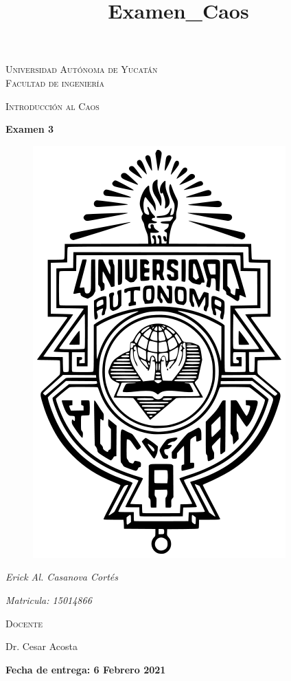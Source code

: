 \documentclass[11pt]{report}
\theoremstyle{plain}
\theoremstyle{definition}
\begin{document}
\begin{titlepage}
\title{Examen_Caos}


	\centering
	{\scshape\LARGE Universidad Autónoma de Yucatán  \\ Facultad de ingeniería\par}
	\vspace{1cm}
	{\scshape\Large Introducción al Caos\par}
	\vspace{1.5cm}
	{\huge\bfseries Examen 3\par}
	\vspace{0.7cm}
	{\begin{figure}[!h]
	\centering
    \includegraphics[scale=0.3]{UADY.png}
	\end{figure}}
	\vspace{0.7cm}
	{\Large\itshape Erick Al. Casanova Cortés\par}
	{\Large\itshape Matricula: 15014866\par}
	\vfill
	{\scshape\Large Docente\par
	Dr. Cesar Acosta\par}
	\vfill
	{\Large{\bfseries Fecha de entrega: 6 Febrero 2021} }

	\vfill
	
\end{titlepage}
\end{document}
